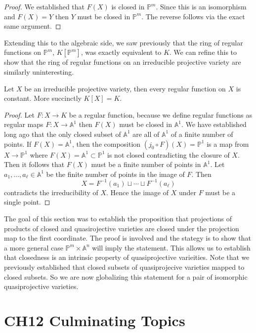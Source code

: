 \documentclass[40pt]{article}
\newcommand{\Proj}{\mathbb{P}}
\newcommand{\A}{\mathbb{A}}
\theoremstyle{remark}
\begin{document}
			\begin{proof}
				We established that $F(X)$ is closed in $\Proj^m$. Since this is an isomorphism and $F(X) = Y$ then $Y$ must be closed in $\Proj^m$. The reverse follows via the exact same argument. 
			\end{proof}
			Extending this to the algebraic side, we saw previously that the ring of regular functions on $\Proj^m$, $K[\Proj^m]$, was exactly equivalent to $K$. We can refine this to show that the ring of regular functions on an irreducible projective variety are similarly uninteresting. 
			\begin{prop}
				Let $X$ be an irreducible projective variety, then every regular function on $X$ is constant. More succinctly $K[X] = K$. 
			\end{prop}
			\begin{proof}
				Let $F: X \to K$ be a regular function, because we define regular functions as regular maps $F: X \to \A^1$ then $F(X)$ must be closed in $\A^1$. We have established long ago that the only closed subset of $\A^1$ are all of $\A^1$ of a finite number of points. If $F(X) = \A^1$, then the composition $(j_0 \circ F)(X) = \Proj^1$ is a map from $X \to \Proj^1$ where $F(X)  = \A^1 \subset \Proj^1$ is not closed contradicting the closure of $X$. Then it follows that $F(X)$ must be a finite number of points in $\A^1$. Let $a_1,\dots,a_\ell \in \A^1$ be the finite number of points in the image of $F$. Then 
				\[
				X= F^{-1}(a_1)\sqcup \cdots\sqcup F^{-1}(a_\ell)
				\]
				contradicts the irreducibility of $X$. Hence the image of $X$ under $F$ must be a single point. 
			\end{proof}
			\begin{summary}
				The goal of this section was to establish the proposition that projections of products of closed and quasirojective varieties are closed under the projection map to the first coordinate. The proof is involved and the stategy is to show that a more general case $\Proj^m \times \A^n$ will imply the statement. This allows us to establish that closedness is an intrinsic property of quasiprojective varieities. Note that we previously established that closed subsets of quasiprojecive varieties mapped to closed subsets. So we are now globalizing this statement for a pair of isomorphic quasiprojective varieties. 
			\end{summary}
		\section{CH12 Culminating Topics}
\end{document}
